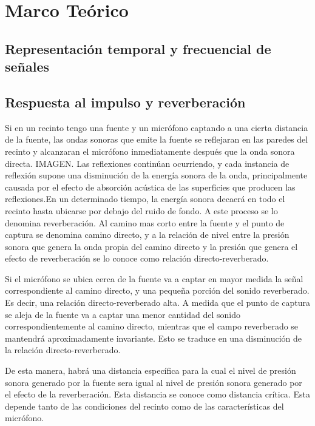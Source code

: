 \section{Marco Teórico}


\subsection{Representación temporal y frecuencial de señales}

\subsection{Respuesta al impulso y reverberación}

Si en un recinto tengo una fuente y un micrófono captando a una cierta distancia de la fuente, las ondas sonoras que emite la fuente se reflejaran en las paredes del recinto y alcanzaran el micrófono inmediatamente después que la onda sonora directa. IMAGEN. Las reflexiones continúan ocurriendo, y cada instancia de reflexión supone una disminución de la energía sonora de la onda, principalmente causada por el efecto de absorción acústica de las superficies que producen las reflexiones.En un determinado tiempo, la energía sonora decaerá en todo el recinto hasta ubicarse por debajo del ruido de fondo. A este proceso se lo denomina reverberación. Al camino mas corto entre la fuente y el punto de captura se denomina camino directo, y a la relación de nivel entre la presión sonora que genera la onda propia del camino directo y la presión que genera el efecto de reverberación se lo conoce como relación directo-reverberado. 

Si el micrófono se ubica cerca de la fuente va a captar en mayor medida la señal correspondiente al camino directo, y una pequeña porción del sonido reverberado. Es decir, una relación directo-reverberado alta. A medida que el punto de captura se aleja de la fuente va a captar una menor cantidad del sonido correspondientemente al camino directo, mientras que el campo reverberado se mantendrá aproximadamente invariante. Esto se traduce en una disminución de la relación directo-reverberado. 

De esta manera, habrá una distancia específica para la cual el nivel de presión sonora generado por la fuente sera igual al nivel de presión sonora generado por el efecto de la reverberación. Esta distancia se conoce como distancia crítica. Esta depende tanto de las condiciones del recinto como de las características del micrófono. 

